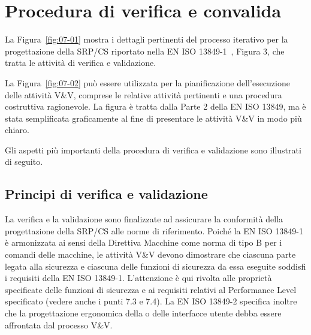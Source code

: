 \section{Procedura di verifica e convalida}
\label{sec:07-1}
La Figura~\ref{fig:07-01} mostra i dettagli pertinenti del processo iterativo per la progettazione della SRP/CS riportato nella EN ISO 13849-1~\cite{eniso13849-1}, Figura 3, che tratta le attività di verifica e validazione.

\begin{center}
    \begin{minipage}{\textwidth}
        \centering
        \captionsetup{hypcap=false}
        \resizebox{0.92\textwidth}{!}{}
        \label{fig:07-01}
    \end{minipage}
\end{center}

La Figura~\ref{fig:07-02} può essere utilizzata per la pianificazione dell'esecuzione delle attività V\&V, comprese le relative attività pertinenti e una procedura costruttiva ragionevole. La figura è tratta dalla Parte 2 della EN ISO 13849, ma è stata semplificata graficamente al fine di presentare le attività V\&V in modo più chiaro.

\begin{center}
    \begin{minipage}{\textwidth}
        \centering
        \captionsetup{hypcap=false}
        \resizebox{\textwidth}{!}{}
        \label{fig:07-02}
    \end{minipage}
\end{center}

Gli aspetti più importanti della procedura di verifica e validazione sono illustrati di seguito.

\subsection{Principi di verifica e validazione}
\label{subsec:07-1-1}
La verifica e la validazione sono finalizzate ad assicurare la conformità della progettazione della SRP/CS alle norme di riferimento. Poiché la EN ISO 13849-1 è armonizzata ai sensi della Direttiva Macchine come norma di tipo B per i comandi delle macchine, le attività V\&V devono dimostrare che ciascuna parte legata alla sicurezza e ciascuna delle funzioni di sicurezza da essa eseguite soddisfi i requisiti della EN ISO 13849-1. L'attenzione è qui rivolta alle proprietà specificate delle funzioni di sicurezza e ai requisiti relativi al Performance Level specificato (vedere anche i punti 7.3 e 7.4). La EN ISO 13849-2 specifica inoltre che la progettazione ergonomica della o delle interfacce utente debba essere affrontata dal processo V\&V.

